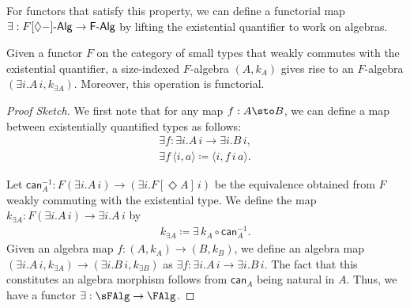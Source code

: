 For functors that satisfy this property, we can define a functorial map $\exists : F[\Diamond{-}]\text-\sf{Alg} \to F\text-\sf{Alg}$ by lifting the existential quantifier to work on algebras.
\begin{proposition}
    Given a functor $F$ on the category of small types that weakly commutes with the existential quantifier, a size-indexed $F$-algebra $(A, k_A)$ gives rise to an $F$-algebra $(\exists i . A \, i, k_{\exists A})$. Moreover, this operation is functorial.
\end{proposition}
\begin{proof}[Proof Sketch]
    We first note that for any map $f : A \sto B$, we can define a map between existentially quantified types as follows:
    \begin{align*}
        \exists f : \exists i . A \, i \to \exists i . B \, i, \\
        \exists f \, \langle i, a \rangle \coloneq  \langle i, f \, i \, a \rangle.
    \end{align*}

    Let $\mathsf{can}^{-1}_A : F(\exists i . A \, i) \to (\exists i . F [\Diamond A] \, i) $ be the equivalence obtained from $F$ weakly commuting with the existential type. We define the map $k_{\exists A} : F (\exists i . A \, i) \to \exists i. A \, i$ by
    \begin{align*}
    k_{\exists A}  \coloneq  \exists \, k_A \circ \mathsf{can}^{-1}_A.
    \end{align*}
    Given an algebra map $f :(A, k_A) \to (B, k_B)$, we define an algebra map $(\exists i . A \, i, k_{\exists A}) \to (\exists i . B \, i, k_{\exists B})$ as $\exists f : \exists i . A \, i \to \exists i . B \, i$.
    The fact that this constitutes an algebra morphism follows from $\mathsf{can}_A$ being natural in $A$. Thus, we have a functor $\exists : \sFAlg \to \FAlg$.
\end{proof}

